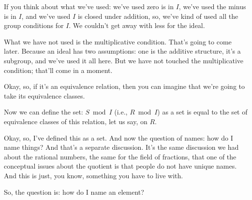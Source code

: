 \begin{speech}[00:32:50 - 00:33:37]
If you think about what we've used: we've used zero is in $I$, we've used the minus is in $I$, and we've used $I$ is closed under addition, so, we've kind of used all the group conditions for $I$. We couldn't get away with less for the ideal. 

What we have not used is the multiplicative condition. That's going to come later. Because an ideal has two assumptions: one is the additive structure, it's a subgroup, and we've used it all here. But we have not touched the multiplicative condition; that'll come in a moment. 

Okay, so, if it's an equivalence relation, then you can imagine that we're going to take its equivalence classes.
\end{speech}

\begin{speech}[00:34:17 - 00:35:13]
Now we can define the set: $S \bmod I$ (i.e., $R \bmod I$) as a set is equal to the set of equivalence classes  of this relation, let us say, on $R$. 

Okay, so, I've defined this as a set. And now the question of names: how do I name things? And that's a separate discussion. It's the same discussion we had about the rational numbers, the same for the field of fractions, that one of the conceptual issues about the quotient is that people do not have unique names. And this is just, you know, something you have to live with. 

So, the question is: how do I name an element? 
\end{speech}

\begin{content}
\end{content}


